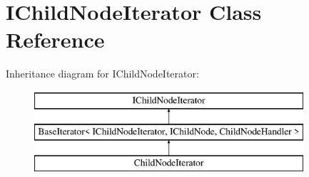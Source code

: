 \hypertarget{class_i_child_node_iterator}{}\section{I\+Child\+Node\+Iterator Class Reference}
\label{class_i_child_node_iterator}
Inheritance diagram for I\+Child\+Node\+Iterator\+:\begin{figure}[H]
\begin{center}
\leavevmode
\includegraphics[height=3.000000cm]{class_i_child_node_iterator}
\end{center}
\end{figure}
